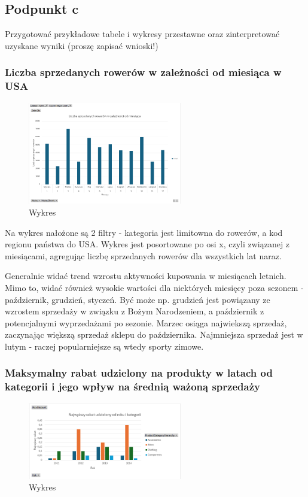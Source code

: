 \documentclass[a4paper,12pt]{article}
\begin{document}
\subsection{Podpunkt c}

Przygotować przykładowe tabele i wykresy przestawne oraz zinterpretować uzyskane
wyniki (proszę zapisać wnioski!)

\subsubsection{Liczba sprzedanych rowerów w zależności od miesiąca w USA}

\begin{figure}[H]
  \centering
  \includegraphics[width=0.6\textwidth]{bike_sales.png}
  \caption{Wykres}
\end{figure}

Na wykres nałożone są 2 filtry - kategoria jest limitowna do rowerów, a kod regionu państwa do USA. Wykres jest posortowane po osi x, czyli związanej z miesiącami, agregując liczbę sprzedanych rowerów dla wszystkich lat naraz.

Generalnie widać trend wzrostu aktywności kupowania w miesiącach letnich. Mimo to, widać również wysokie wartości dla niektórych miesięcy poza sezonem - październik, grudzień, styczeń. Być może np. grudzień jest powiązany ze wzrostem sprzedaży w związku z Bożym Narodzeniem, a październik z potencjalnymi wyprzedażami po sezonie. Marzec osiąga najwiekszą sprzedaż, zaczynając większą sprzedaż sklepu do października. Najmniejsza sprzedaż jest w lutym - raczej popularniejsze są wtedy sporty zimowe.

\subsubsection{Maksymalny rabat udzielony na produkty w latach od kategorii i jego wpływ na średnią ważoną sprzedaży}

\begin{figure}[H]
  \centering
  \includegraphics[width=0.6\textwidth]{max_discounts.png}
  \caption{Wykres}
\end{figure}
\end{document}
